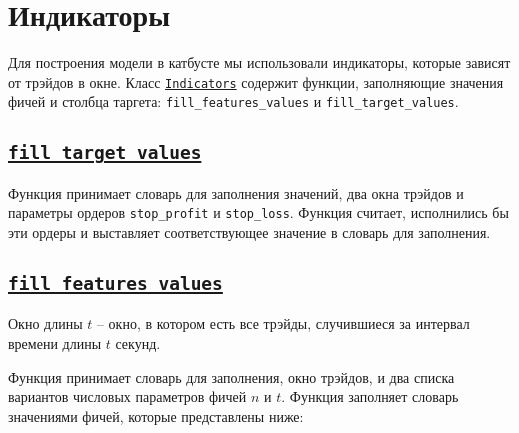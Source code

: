 \section{Индикаторы}

Для построения модели в катбусте мы использовали индикаторы, которые зависят от трэйдов в окне. Класс \href{https://github.com/dexety/dex-trading-system/blob/ca0370d602f2dfa05262b9b8574002f965ac1502/utils/indicators.py#L5}{\texttt{Indicators}} содержит функции, заполняющие значения фичей и столбца таргета: \texttt{fill\_features\_values} и \texttt{fill\_target\_values}.

\subsection{\href{https://github.com/dexety/dex-trading-system/blob/ca0370d602f2dfa05262b9b8574002f965ac1502/utils/indicators.py#L15}{\texttt{fill\_target\_values}}}

Функция принимает словарь для заполнения значений, два окна трэйдов и параметры ордеров \texttt{stop\_profit} и \texttt{stop\_loss}. Функция считает, исполнились бы эти ордеры и выставляет соответствующее значение в словарь для заполнения.

\subsection{\href{https://github.com/dexety/dex-trading-system/blob/ca0370d602f2dfa05262b9b8574002f965ac1502/utils/indicators.py#L48}{\texttt{fill\_features\_values}}}

\begin{designation}
Окно длины $t$ -- окно, в котором есть все трэйды, случившиеся за интервал времени длины $t$ секунд.
\end{designation}

Функция принимает словарь для заполнения, окно трэйдов, и два списка вариантов числовых параметров фичей $n$ и $t$. Функция заполняет словарь значениями фичей, которые представлены ниже:

